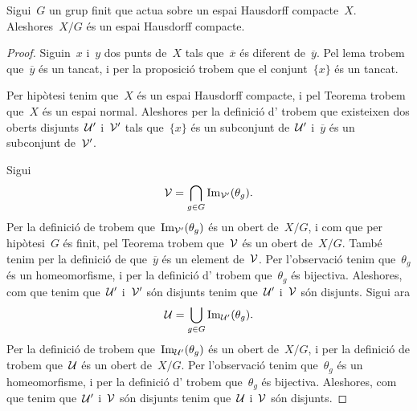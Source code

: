 \documentclass[../../main.tex]{subfiles}
\begin{document}
    \begin{theorem}
        \label{thm:el quocient d'un Hausdorff compacte per un grup finit és Hausdorff compacte}
        Sigui~\(G\) un grup finit que actua sobre un espai Hausdorff compacte~\(X\).
        Aleshores~\(X/G\) és un espai Hausdorff compacte.
        \begin{proof} %
            Siguin~\(x\) i~\(y\) dos punts de~\(X\) tals que~\(\overline{x}\) és diferent de~\(\overline{y}\).
            Pel lema  trobem que~\(\overline{y}\) és un tancat, i per la proposició  trobem que el conjunt~\(\{x\}\) és un tancat.

            Per hipòtesi tenim que~\(X\) és un espai Hausdorff compacte, i pel Teorema  trobem que~\(X\) és un espai normal.
            Aleshores per la definició d' trobem que existeixen dos oberts disjunts~\(\mathcal{U}'\) i~\(\mathcal{V}'\) tals que~\(\{x\}\) és un subconjunt de~\(\mathcal{U}'\) i~\(\overline{y}\) és un subconjunt de~\(\mathcal{V}'\).

            Sigui
            \[
                \mathcal{V}=\bigcap_{g\in G}\operatorname{Im}_{\mathcal{V}'}(\theta_{g}).
            \]
            Per la definició de  trobem que~\(\operatorname{Im}_{\mathcal{V}'}(\theta_{g})\) és un obert de~\(X/G\), i com que per hipòtesi~\(G\) és finit, pel Teorema  trobem que~\(\mathcal{V}\) és un obert de~\(X/G\).
            També tenim per la definició de  que~\(\overline{y}\) és un element de~\(\mathcal{V}\).
            Per l'observació  tenim que~\(\theta_{g}\) és un homeomorfisme, i per la definició d' trobem que~\(\theta_{g}\) és bijectiva.
            Aleshores, com que tenim que~\(\mathcal{U}'\) i~\(\mathcal{V}'\) són disjunts tenim que~\(\mathcal{U}'\) i~\(\mathcal{V}\) són disjunts.
            Sigui ara
            \[
                \mathcal{U}=\bigcup_{g\in G}\operatorname{Im}_{\mathcal{U}'}(\theta_{g}).
            \]
            Per la definició de  trobem que~\(\operatorname{Im}_{\mathcal{U}'}(\theta_{g})\) és un obert de~\(X/G\), i per la definició de  trobem que~\(\mathcal{U}\) és un obert de~\(X/G\).
            Per l'observació  tenim que~\(\theta_{g}\) és un homeomorfisme, i per la definició d' trobem que~\(\theta_{g}\) és bijectiva.
            Aleshores, com que tenim que~\(\mathcal{U}'\) i~\(\mathcal{V}\) són disjunts tenim que~\(\mathcal{U}\) i~\(\mathcal{V}\) són disjunts.


\end{proof}
\end{theorem}
\end{document}

